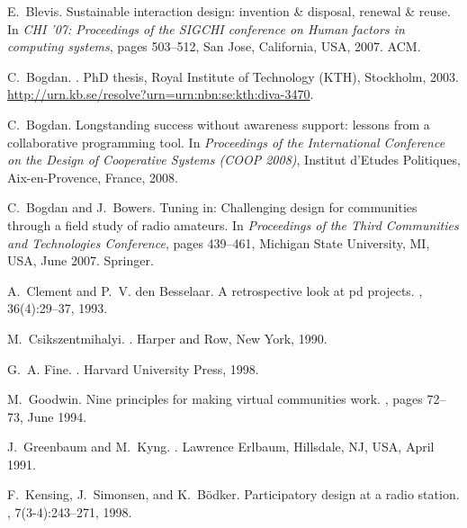 \documentclass{sig-alt-release2}
\begin{document}
\begin{thebibliography}{10}

E.~Blevis.
\newblock Sustainable interaction design: invention \& disposal, renewal \&
  reuse.
\newblock In {\em CHI '07: Proceedings of the SIGCHI conference on Human
  factors in computing systems}, pages 503--512, San Jose, California, USA,
  2007. ACM.

C.~Bogdan.
.
\newblock PhD thesis, Royal Institute of Technology (KTH), Stockholm, 2003.
\newblock \url{http://urn.kb.se/resolve?urn=urn:nbn:se:kth:diva-3470}.

C.~Bogdan.
\newblock Longstanding success without awareness support: lessons from a
  collaborative programming tool.
\newblock In {\em Proceedings of the International Conference on the Design of
  Cooperative Systems (COOP 2008)}, Institut d'Etudes Politiques,
  Aix-en-Provence, France, 2008.

C.~Bogdan and J.~Bowers.
\newblock Tuning in: Challenging design for communities through a field study
  of radio amateurs.
\newblock In {\em Proceedings of the Third Communities and Technologies
  Conference}, pages 439--461, Michigan State University, MI, USA, June 2007.
  Springer.

A.~Clement and P.~V. den Besselaar.
\newblock A retrospective look at pd projects.
, 36(4):29--37, 1993.

M.~Csikszentmihalyi.
.
\newblock Harper and Row, New York, 1990.

G.~A. Fine.
.
\newblock Harvard University Press, 1998.

M.~Goodwin.
\newblock Nine principles for making virtual communities work.
, pages 72--73, June 1994.

J.~Greenbaum and M.~Kyng.
.
\newblock Lawrence Erlbaum, Hillsdale, NJ, USA, April 1991.

F.~Kensing, J.~Simonsen, and K.~B\"odker.
\newblock Participatory design at a radio station.
, 7(3-4):243--271, 1998.


\end{thebibliography}
\end{document}
